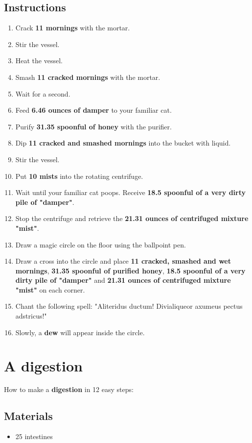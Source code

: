 \documentclass{article}
\begin{document}
\subsection{Instructions}\begin{enumerate}
\item 
Crack \textbf{11 mornings} with the mortar.
\item 
Stir the vessel.
\item 
Heat the vessel.
\item 
Smash \textbf{11 cracked mornings} with the mortar.
\item 
Wait for a second.
\item 
Feed \textbf{6.46 ounces of damper} to your familiar cat.
\item 
Purify \textbf{31.35 spoonful of honey} with the purifier.
\item 
Dip \textbf{11 cracked and smashed mornings} into the bucket with liquid.
\item 
Stir the vessel.
\item 
Put \textbf{10 mists} into the rotating centrifuge.
\item 
Wait until your familiar cat poops. Receive \textbf{18.5 spoonful of a very dirty pile of "damper"}.
\item 
Stop the centrifuge and retrieve the \textbf{21.31 ounces of centrifuged mixture "mist"}.
\item 
Draw a magic circle on the floor using the ballpoint pen.
\item 
Draw a cross into the circle and place \textbf{11 cracked, smashed and wet mornings}, \textbf{31.35 spoonful of purified honey}, \textbf{18.5 spoonful of a very dirty pile of "damper"} and \textbf{21.31 ounces of centrifuged mixture "mist"} on each corner.
\item 
Chant the following spell: "Aliteridus ductum! Divialiqueor axumeus pectus adstricus!"
\item 
Slowly, a \textbf{dew} will appear inside the circle.
\end{enumerate}
\newpage
\section{A digestion}How to make a \textbf{digestion} in 12 easy steps:

\subsection{Materials}\begin{itemize}
\item 
25 intestines
\end{itemize}
\end{document}
